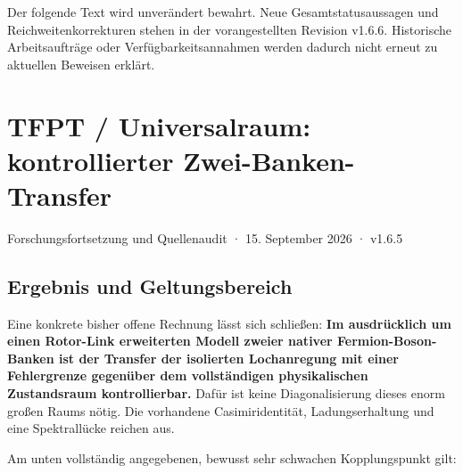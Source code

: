 Der folgende Text wird unverändert bewahrt. Neue Gesamtstatusaussagen
und Reichweitenkorrekturen stehen in der vorangestellten Revision
v1.6.6. Historische Arbeitsaufträge oder Verfügbarkeitsannahmen werden
dadurch nicht erneut zu aktuellen Beweisen erklärt.

\section{TFPT / Universalraum: kontrollierter
Zwei-Banken-Transfer}\label{tfpt-universalraum-kontrollierter-zwei-banken-transfer}

Forschungsfortsetzung und Quellenaudit · 15. September 2026 · v1.6.5

\subsection{Ergebnis und
Geltungsbereich}\label{ergebnis-und-geltungsbereich}

Eine konkrete bisher offene Rechnung lässt sich schließen: \textbf{Im
ausdrücklich um einen Rotor-Link erweiterten Modell zweier nativer
Fermion-Boson-Banken ist der Transfer der isolierten Lochanregung mit
einer Fehlergrenze gegenüber dem vollständigen physikalischen
Zustandsraum kontrollierbar.} Dafür ist keine Diagonalisierung dieses
enorm großen Raums nötig. Die vorhandene Casimiridentität,
Ladungserhaltung und eine Spektrallücke reichen aus.

Am unten vollständig angegebenen, bewusst sehr schwachen Kopplungspunkt
gilt:


